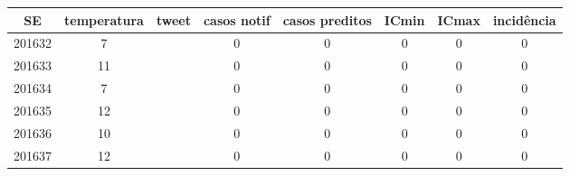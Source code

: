 \begin{tabular}{c|ccccccc}
  \hline
SE & temperatura & tweet & casos notif & casos preditos & ICmin & ICmax & incidência \\ 
  \hline
201632 & 7 &  & 0 & 0 & 0 & 0 & 0 \\ 
  201633 & 11 &  & 0 & 0 & 0 & 0 & 0 \\ 
  201634 & 7 &  & 0 & 0 & 0 & 0 & 0 \\ 
  201635 & 12 &  & 0 & 0 & 0 & 0 & 0 \\ 
  201636 & 10 &  & 0 & 0 & 0 & 0 & 0 \\ 
  201637 & 12 &  & 0 & 0 & 0 & 0 & 0 \\ 
   \hline
\end{tabular}
